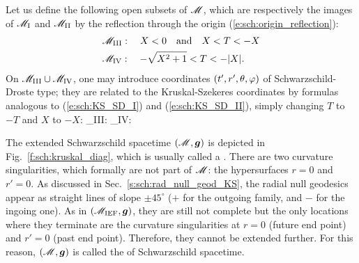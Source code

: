 Let us define the following open subsets of $\mathscr{M}$, which are respectively
the images of $\mathscr{M}_{\rm I}$ and $\mathscr{M}_{\rm II}$ by the reflection through the origin
(\ref{e:sch:origin_reflection}):
\begin{subequations}
\label{e:max:range_TX_M_III_IV}
\begin{align}
 & \mathscr{M}_{\rm III}: \quad X < 0 \quad\mbox{and}\quad X < T < -X \\
 & \mathscr{M}_{\rm IV}: \quad - \sqrt{X^2+1} < T < -|X| .
\end{align}
\end{subequations}
On $\mathscr{M}_{\rm III}\cup \mathscr{M}_{\rm IV}$, one may introduce coordinates
$(t',r',\theta,\varphi)$ of Schwarzschild-Droste type; they are related to
the Kruskal-Szekeres coordinates by formulas analogous to
(\ref{e:sch:KS_SD_I}) and (\ref{e:sch:KS_SD_II}), simply changing $T$ to $-T$
and $X$ to $-X$:
\be \label{e:sch:KS_SD_III}
    \M_{\rm III}: \quad {}
    \iff
\ee
\be \label{e:sch:KS_SD_IV}
    \M_{\rm IV}: \quad {}
    \iff
\ee

The extended Schwarzschild spacetime $(\mathscr{M},\bm{g})$ is depicted in
Fig.~\ref{f:sch:kruskal_diag}, which is usually called a
.
There are two curvature singularities, which formally are not part of $\mathscr{M}$:
the hypersurfaces $r=0$ and $r'=0$.
As discussed in Sec.~\ref{s:sch:rad_null_geod_KS}, the radial null
geodesics appear as straight lines of slope $\pm 45^\circ$ ($+$ for the
outgoing family, and $-$ for the ingoing one).
As in $(\mathscr{M}_{\rm IEF},\bm{g})$, they are still not complete but the only
locations where they terminate are the curvature singularities
at $r=0$ (future end point) and $r'=0$ (past end point). Therefore, they cannot
be extended further. For this reason, $(\mathscr{M},\bm{g})$ is called the
of Schwarzschild spacetime.

